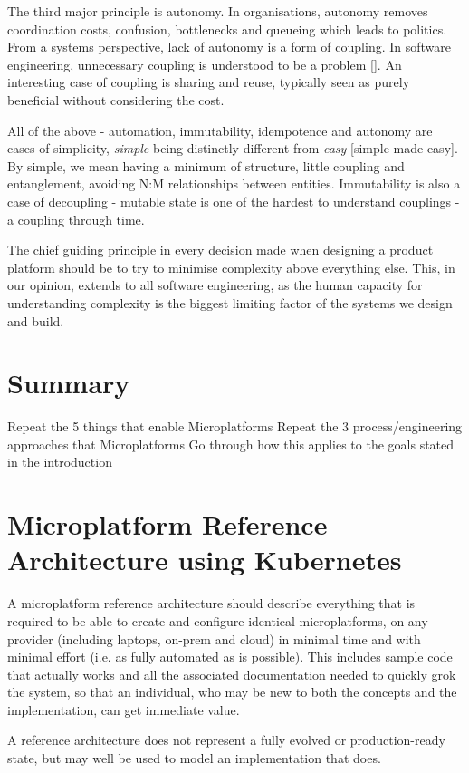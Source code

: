 \documentclass[reprint,amsmath,amssymb,aps]{revtex4-1}
\begin{document}
The third major principle is autonomy. In organisations, autonomy removes coordination costs, confusion, bottlenecks and queueing which leads to politics. From a systems perspective, lack of autonomy is a form of coupling. In software engineering, unnecessary coupling is understood to be a problem []. An interesting case of coupling is sharing and reuse, typically seen as purely beneficial without considering the cost.

All of the above - automation, immutability, idempotence and autonomy are cases of simplicity, \textit{simple} being distinctly different from \textit{easy} [simple made easy]. By simple, we mean having a minimum of structure, little coupling and entanglement, avoiding N:M relationships between entities. Immutability is also a case of decoupling - mutable state is one of the hardest to understand couplings - a coupling through time.

The chief guiding principle in every decision made when designing a product platform should be to try to minimise complexity above everything else. This, in our opinion, extends to all software engineering, as the human capacity for understanding complexity is the biggest limiting factor of the systems we design and build.

\section*{\label{sec:summary}Summary}

Repeat the 5 things that enable Microplatforms
Repeat the 3 process/engineering approaches that Microplatforms
Go through how this applies to the goals stated in the introduction

\newpage
\clearpage
\appendix
\section{\label{sec:architecture}Microplatform Reference Architecture using Kubernetes}

A microplatform reference architecture should describe everything that is required to be able to create and configure identical microplatforms, on any provider (including laptops, on-prem and cloud) in minimal time and with minimal effort (i.e. as fully automated as is possible). This includes sample code that actually works and all the associated documentation needed to quickly grok the system, so that an individual, who may be new to both the concepts and the implementation, can get immediate value.

A reference architecture does not represent a fully evolved or production-ready state, but may well be used to model an implementation that does.



\end{document}
